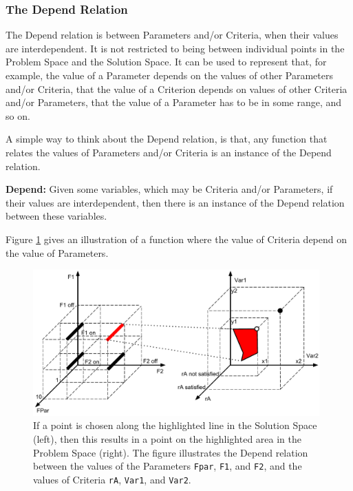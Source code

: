 \documentclass[graybox]{svmult}
\newcommand{\xb}[1]{\textbf{#1}}
\newcommand{\xt}[1]{\texttt{#1}}
\newcommand{\req}[1]{\xt{#1}}
\newcommand{\SolutionSpace}{Solution Space}
\newcommand{\ProblemSpace}{Problem Space}
\newcommand{\Criterion}{Criterion}
\newcommand{\Criteria}{Criteria}
\newcommand{\Parameter}{Parameter}
\newcommand{\Depend}{Depend}
\begin{document}
%
\subsubsection{The \Depend{} Relation}\label{s:spaces:relationships:depend}
The \Depend{} relation is between \Parameter s and/or \Criteria, when their values are interdependent. It is not restricted to being between individual points in the \ProblemSpace{} and the \SolutionSpace. It can be used to represent that, for example, the value of a \Parameter{} depends on the values of other \Parameter s and/or \Criteria, that the value of a \Criterion{} depends on values of other \Criteria{} and/or \Parameter s, that the value of a \Parameter{} has to be in some range, and so on.

A simple way to think about the \Depend{} relation, is that, any function that relates the values of \Parameter s and/or \Criteria{} is an instance of the \Depend{} relation.

\begin{definition}\label{d:depend}
\xb{\Depend:} Given some variables, which may be \Criteria{} and/or \Parameter s, if their values are interdependent, then there is an instance of the \Depend{} relation between these variables.
\end{definition}

Figure \ref{f:ex:depend-relation} gives an illustration of a function where the value of \Criteria{} depend on the value of \Parameter s.

\begin{figure}[t]
	\centering
	\includegraphics[width=110mm]{Figures/f-ex-depend-relation}
\caption{If a point is chosen along the highlighted line in the \SolutionSpace{} (left), then this results in a point on the highlighted area in the \ProblemSpace{} (right). The figure illustrates the \Depend{} relation between the values of the \Parameter s \req{Fpar}, \req{F1}, and \req{F2}, and the values of \Criteria{} \req{rA}, \req{Var1}, and \req{Var2}.}
\label{f:ex:depend-relation}
\end{figure}
\end{document}
